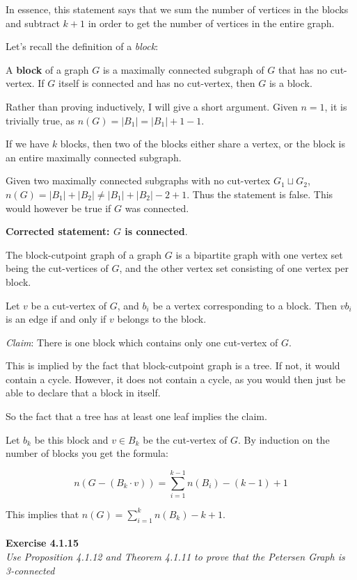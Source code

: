 In essence, this statement says that we sum the number of vertices in the blocks and subtract $k+1$ in order to get the number of vertices in the entire graph.

Let's recall the definition of a \textit{block}:
\begin{definition}[Block]
	A \textbf{block} of a graph $G$ is a maximally connected subgraph of $G$ that has no cut-vertex. If $G$ itself is connected and has no cut-vertex, then $G$ is a block.
\end{definition}

Rather than proving inductively, I will give a short argument. Given $n = 1$, it is trivially true, as $n(G) = |B_{1}| = |B_{1}| + 1 - 1$.

If we have $k$ blocks, then two of the blocks either share a vertex, or the block is an entire maximally connected subgraph.

Given two maximally connected subgraphs with no cut-vertex $G_{1} \sqcup G_{2}$, $n(G) = |B_{1}| + |B_{2}| \ne |B_{1}| + |B_{2}| - 2 + 1$. Thus the statement is false. This would however be true if $G$ was connected.

\textbf{Corrected statement: $G$ is connected}.

\begin{definition}
	The block-cutpoint graph of a graph $G$ is a bipartite graph with one vertex set being the cut-vertices of $G$, and the other vertex set consisting of one vertex per block.
\end{definition}

Let $v$ be a cut-vertex of $G$, and $b_{i}$ be a vertex corresponding to a block. Then $vb_{i}$ is an edge if and only if $v$ belongs to the block.

\textit{Claim}: There is one block which contains only one cut-vertex of $G$.

This is implied by the fact that block-cutpoint graph is a tree. If not, it would contain a cycle. However, it does not contain a cycle, as you would then just be able to declare that a block in itself.

So the fact that a tree has at least one leaf implies the claim.

Let $b_{k}$ be this block and $v \in B_{k}$ be the cut-vertex of $G$. By induction on the number of blocks you get the formula:

\[
	n(G-(B_{k} \cdot v)) = \sum_{i=1}^{k-1} n(B_{i})-(k-1)+1
\]

This implies that $n(G) = \sum_{i=1}^k n(B_{k}) - k +1$.
\\\\
\noindent
\textbf{Exercise 4.1.15 }\\
\noindent
\textit{Use Proposition 4.1.12 and Theorem 4.1.11 to prove that the Petersen Graph is 3-connected}\\

